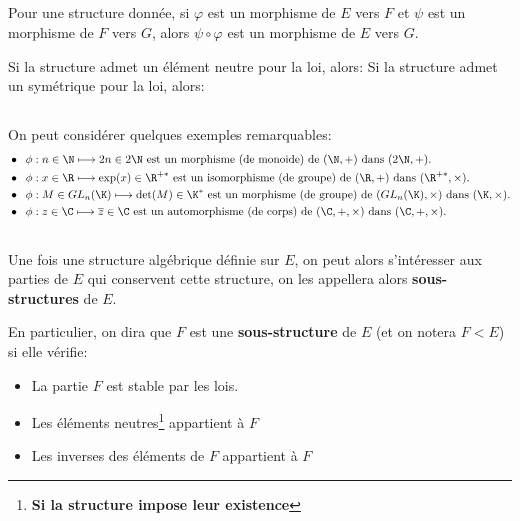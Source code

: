 \subsection*{}
Pour une structure donnée, si \(\varphi\) est un morphisme de \(E\) vers \(F\) et \(\psi\) est un morphisme de \(F\) vers \(G\), alors \(\psi \circ \varphi\) est un morphisme de \(E\) vers \(G\).\<

Si la structure admet un élément neutre pour la loi, alors:
Si la structure admet un symétrique pour la loi, alors:
\subsection*{}
On peut considérer quelques exemples remarquables:
\begin{align*}
   &\bullet \;\; \text{\(\phi: n \in \N \longmapsto 2n \in 2\N\) est un morphisme (de monoide) de \((\N, +)\) dans \((2\N, +)\).}\\
   &\bullet \;\; \text{\(\phi: x \in \R \longmapsto \exp(x) \in \R^{+*}\) est un isomorphisme (de groupe) de \((\R, +)\) dans \((\R^{+*}, \times)\).}\\  
   &\bullet \;\; \text{\(\phi: M \in GL_{n}(\K) \longmapsto \det(M) \in \K^*\) est un morphisme (de groupe) de \((GL_{n}(\K), \times)\) dans \((\K, \times)\).}\\
   &\bullet \;\; \text{\(\phi: z \in \C \longmapsto \overline{z} \in \C\) est un automorphisme (de corps) de \((\C, +, \times)\) dans \((\C, +, \times)\).}
\end{align*}
\pagebreak
\subsection*{}

Une fois une structure algébrique définie sur \(E\), on peut alors s'intéresser aux parties de \(E\) qui conservent cette structure, on les appellera alors \textbf{sous-structures} de \(E\).\<

En particulier, on dira que \(F\) est une \textbf{sous-structure} de \(E\) (et on notera \(F < E\)) si elle vérifie:
\begin{itemize}
   \item La partie \(F\) est stable par les lois.
   \item Les éléments neutres\footnote[1]{\label{struct}\textbf{Si la structure impose leur existence}} appartient à \(F\) 
   \item Les inverses des éléments de \(F\) appartient à \(F\)
\end{itemize}

